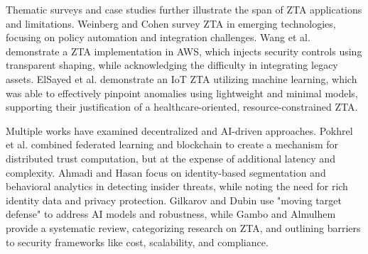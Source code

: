 \documentclass[conference]{IEEEtran}
\begin{document}
Thematic surveys and case studies further illustrate the span of ZTA applications and limitations. Weinberg and Cohen \cite{paper4} survey ZTA in emerging technologies, focusing on policy automation and integration challenges. Wang et al.\cite{paper5} demonstrate a ZTA implementation in AWS, which injects security controls using transparent shaping, while acknowledging the difficulty in integrating legacy assets. ElSayed et al. \cite{paper6} demonstrate an IoT ZTA utilizing machine learning, which was able to effectively pinpoint anomalies using lightweight and minimal models, supporting their justification of a healthcare-oriented, resource-constrained ZTA.


Multiple works have examined decentralized and AI-driven approaches. Pokhrel et al. \cite{paper7} combined federated learning and blockchain to create a mechanism for distributed trust computation, but at the expense of additional latency and complexity. Ahmadi \cite{paper8} and Hasan \cite{paper11} focus on identity-based segmentation and behavioral analytics in detecting insider threats, while noting the need for rich identity data and privacy protection. Gilkarov and Dubin \cite{paper9} use "moving target defense" to address AI models and robustness, while Gambo and Almulhem \cite{paper10} provide a systematic review, categorizing research on ZTA, and outlining barriers to security frameworks like cost, scalability, and compliance.
\end{document}

